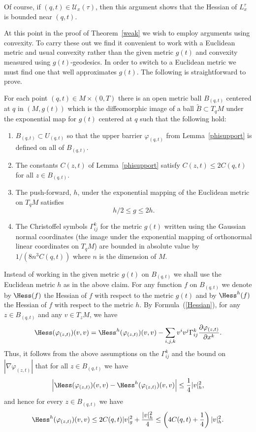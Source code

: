 Of course, if $(q,t)\in {\mathcal U}_{x}(\tau)$, then this argument
shows that the Hessian of $L^\tau_{x}$ is bounded near $(q,t)$.


At this point in the proof of Theorem~\ref{weak} we wish to employ
arguments using convexity. To carry these out we find it convenient
to work with a Euclidean metric and usual convexity rather than the
given metric $g(t)$ and convexity measured using $g(t)$-geodesics.
In order to switch to a Euclidean metric we must find one that well
approximates $g(t)$. The following is straightforward to prove.

\begin{claim}
\label{claim:euclidean-approximating-ball}
For each point $(q,t)\in M\times(0,T)$ there is an open metric ball
$B_{(q,t)}$ centered at $q$ in $(M,g(t))$ which is the diffeomorphic
image of a ball $\widetilde B\subset T_qM$ under the exponential map
for $g(t)$ centered at $q$ such that the following hold:
\begin{enumerate}
\item $B_{(q,t)}\subset U_{(q,t)}$ so that the upper barrier $\varphi_{(q,t)}$
from Lemma~\ref{phisupport} is defined on all of $B_{(q,t)}$.
\item The constants $C(z,t)$ of Lemma~\ref{phisupport} satisfy
$C(z,t)\le 2C(q,t)$ for all $z\in B_{(q,t)}$.
\item The push-forward, $h$, under the exponential mapping of the Euclidean
metric on $T_qM$ satisfies $$h/2\le g\le 2h.$$
\item The Christoffel symbols $\Gamma_{ij}^k$ for the
metric $g(t)$ written using the Gaussian normal coordinates (the
image under the exponential mapping of orthonormal linear
coordinates on $T_qM$) are bounded in absolute value by
$1/(8n^3C(q,t))$ where $n$ is the dimension of $M$.
\end{enumerate}
\end{claim}

Instead of working in the given metric $g(t)$ on $B_{(q,t)}$ we
shall use the Euclidean metric $h$ as in the above claim. For any
function $f$ on $B_{(q,t)}$ we denote by $\Hess(f)$ the Hessian
of $f$ with respect to the metric $g(t)$ and by $\Hess^h(f)$
the Hessian of $f$ with respect to the metric $h$. By
Formula~(\ref{Hessian}), for any $z\in B_{(q,t)}$ and any $v\in
T_zM$, we have
$$\Hess(\varphi_{(z,t)})(v,v)=\Hess^h(\varphi_{(z,t)})(v,v)
-\sum_{i,j,k}v^iv^j\Gamma_{ij}^k\frac{\partial
\varphi_{(z,t)}}{\partial x^k}.$$ Thus, it follows from the above
assumptions on the $\Gamma_{ij}^k$ and the bound on $|\nabla
\varphi_{(z,t)}|$ that for all $z\in B_{(q,t)}$ we have
\begin{equation}\label{Hessdiff}
\left|\Hess(\varphi_{(z,t)})(v,v)-\Hess^h(\varphi_{(z,t)})(v,v)\right|\le
\frac{1}{4}|v|^2_h,\end{equation} and hence for every $z\in
B_{(q,t)}$ we have
$$\Hess^h(\varphi_{(z,t)})(v,v)\le 2C(q,t)|v|^2_g+\frac{|v|_h^2}{4}\le
\left(4C(q,t)+\frac{1}{4}\right)|v|_h^2.$$




